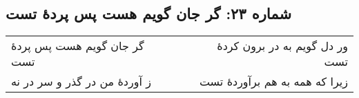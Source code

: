 \begin{center}
\section*{شماره ۲۳: گر جان گویم هست پس پردۀ تست}
\label{sec:023}
\begin{longtable}{l p{0.5cm} r}
گر جان گویم هست پس پردهٔ تست
&&
ور دل گویم به در برون کردهٔ تست
\\
ز آوردهٔ من در گذر و سر در نه
&&
زیرا که همه به هم برآوردهٔ تست
\\
\end{longtable}
\end{center}
